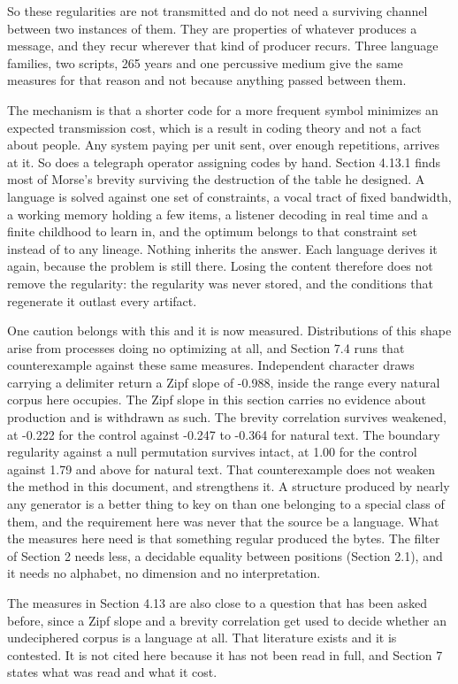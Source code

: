 So these regularities are not transmitted and do not need a surviving channel between two instances of them. They are properties of whatever produces a message, and they recur wherever that kind of producer recurs. Three language families, two scripts, 265 years and one percussive medium give the same measures for that reason and not because anything passed between them.

The mechanism is that a shorter code for a more frequent symbol minimizes an expected transmission cost, which is a result in coding theory and not a fact about people. Any system paying per unit sent, over enough repetitions, arrives at it. So does a telegraph operator assigning codes by hand. Section 4.13.1 finds most of Morse's brevity surviving the destruction of the table he designed. A language is solved against one set of constraints, a vocal tract of fixed bandwidth, a working memory holding a few items, a listener decoding in real time and a finite childhood to learn in, and the optimum belongs to that constraint set instead of to any lineage. Nothing inherits the answer. Each language derives it again, because the problem is still there. Losing the content therefore does not remove the regularity: the regularity was never stored, and the conditions that regenerate it outlast every artifact.

One caution belongs with this and it is now measured. Distributions of this shape arise from processes doing no optimizing at all, and Section 7.4 runs that counterexample against these same measures. Independent character draws carrying a delimiter return a Zipf slope of -0.988, inside the range every natural corpus here occupies. The Zipf slope in this section carries no evidence about production and is withdrawn as such. The brevity correlation survives weakened, at -0.222 for the control against -0.247 to -0.364 for natural text. The boundary regularity against a null permutation survives intact, at 1.00 for the control against 1.79 and above for natural text. That counterexample does not weaken the method in this document, and strengthens it. A structure produced by nearly any generator is a better thing to key on than one belonging to a special class of them, and the requirement here was never that the source be a language. What the measures here need is that something regular produced the bytes. The filter of Section 2 needs less, a decidable equality between positions (Section 2.1), and it needs no alphabet, no dimension and no interpretation.

The measures in Section 4.13 are also close to a question that has been asked before, since a Zipf slope and a brevity correlation get used to decide whether an undeciphered corpus is a language at all. That literature exists and it is contested. It is not cited here because it has not been read in full, and Section 7 states what was read and what it cost.

